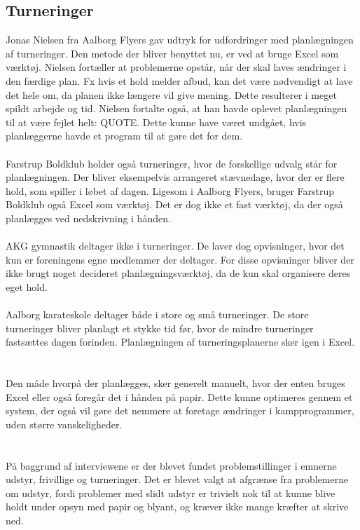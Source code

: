 \subsection*{Turneringer}
Jonas Nielsen fra Aalborg Flyers gav udtryk for udfordringer med planlægningen af turneringer. Den metode der bliver benyttet nu, er ved at bruge Excel som værktøj. Nielsen fortæller at problemerne opstår, når der skal laves ændringer i den færdige plan. Fx hvis et hold melder afbud, kan det være nødvendigt at lave det hele om, da planen ikke længere vil give mening. Dette resulterer i meget spildt arbejde og tid. Nielsen fortalte også, at han havde oplevet planlægningen til at være fejlet helt: QUOTE. Dette kunne have været undgået, hvis planlæggerne havde et program til at gøre det for dem.
\\\\
Farstrup Boldklub holder også turneringer, hvor de forskellige udvalg står for planlægningen. Der bliver eksempelvis arrangeret stævnedage, hvor der er flere hold, som spiller i løbet af dagen. Ligesom i Aalborg Flyers, bruger Farstrup Boldklub også Excel som værktøj. Det er dog ikke et fast værktøj, da der også planlægges ved nedskrivning i hånden.
\\\\
AKG gymnastik deltager ikke i turneringer. De laver dog opvisninger, hvor det kun er foreningens egne medlemmer der deltager. For disse opvisninger bliver der ikke brugt noget decideret planlægningsværktøj, da de kun skal organisere deres eget hold.  %
\\\\
Aalborg karateskole deltager både i store og små turneringer. De store turneringer bliver planlagt et stykke tid før, hvor de mindre turneringer fastsættes dagen forinden. Planlægningen af turneringsplanerne sker igen i Excel. 
\\\\\\
Den måde hvorpå der planlægges, sker generelt manuelt, hvor der enten bruges Excel eller også foregår det i hånden på papir. Dette kunne optimeres gennem et system, der også vil gøre det nemmere at foretage ændringer i kampprogrammer, uden større vanskeligheder.
\\\\\\
På baggrund af interviewene er der blevet fundet problemstillinger i emnerne udstyr, frivillige og turneringer. Det er blevet valgt at afgrænse fra problemerne om udstyr, fordi problemer med slidt udstyr er trivielt nok til at kunne blive holdt under opsyn med papir og blyant, og kræver ikke mange kræfter at skrive ned. \\
